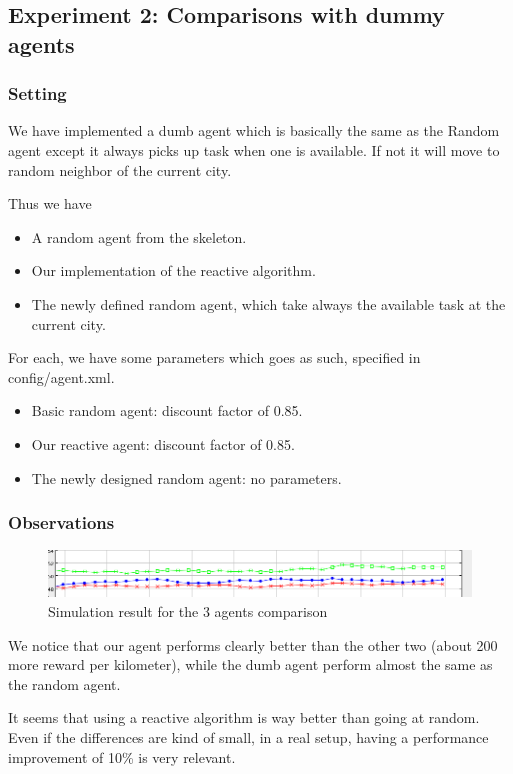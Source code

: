 \documentclass[11pt]{article}
\begin{document}
\subsection{Experiment 2: Comparisons with dummy agents}

\subsubsection{Setting}
We have implemented a dumb agent which is basically the same as the
Random agent except it always picks up task when one is available. If
not it will move to random neighbor of the current city.

Thus we have
\begin{itemize}
	\item A random agent from the skeleton.
	\item Our implementation of the reactive algorithm.
	\item The newly defined random agent, which take always the available
		task at the current city.
\end{itemize}

For each, we have some parameters which goes as such, specified in
config/agent.xml.
\begin{itemize}
	\item Basic random agent: discount factor of 0.85.
	\item Our reactive agent: discount factor of 0.85.
	\item The newly designed random agent: no parameters.
\end{itemize}

\subsubsection{Observations}
\begin{figure}
  \caption{Simulation result for the 3 agents comparison}
  \includegraphics[scale=0.6]{compare_3}
\end{figure}

We notice that our agent performs clearly better than the other two
(about 200 more reward per kilometer), while the dumb agent perform
almost the same as the random agent.

It seems that using a reactive algorithm is way better than going at random.
Even if the differences are kind of small, in a real setup, having a performance
improvement of 10\% is very relevant.
\end{document}
